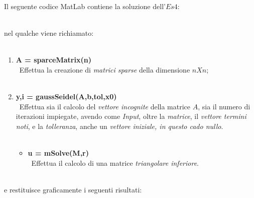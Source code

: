 Il seguente codice MatLab contiene la soluzione dell'$Es 4$:\\\

nel qualche viene richiamato:\\\
\begin{enumerate}
	\item \textbf{A = sparceMatrix(n)}\\\
		Effettua la creazione di \textit{matrici sparse} della dimensione $nXn$;\\\
	\item \textbf{y,i = gaussSeidel(A,b,tol,x0)}\\\
		Effettua sia il calcolo del \textit{vettore incognite} della matrice $A$, sia il numero di iterazioni impiegate, avendo come \textit{Input}, oltre la 	\textit{matrice}, il \textit{vettore termini noti}, e la \textit{tolleranza}, anche un \textit{vettore iniziale, in questo cado nullo}.\\\
		
	\begin{itemize}
		\item \textbf{u = mSolve(M,r)}\\\
			Effettua il calcolo di una matrice \textit{triangolare inferiore}.\\\
			
	\end{itemize}
\end{enumerate}
e restituisce graficamente i seguenti risultati:\\\

